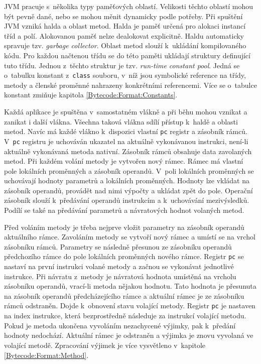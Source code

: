 JVM pracuje s~několika typy paměťových oblastí. Velikosti těchto oblastí mohou být pevně dané, nebo se mohou měnit dynamicky podle potřeby. Při spuštění JVM vzniká halda a oblast metod. Halda je paměť určená pro alokaci instancí tříd a polí. Alokovanou paměť nelze dealokovat explicitně. Haldu automaticky spravuje tzv. \textit{garbage collector}. Oblast metod slouží k~ukládání kompilovaného kódu. Pro každou načtenou třídu se do této paměti ukládají struktury definující tuto třídu. Jednou z~těchto struktur je tzv. \textit{run-time constant pool}. Jedná se o~tabulku konstant z~\texttt{class} souboru, v~níž jsou symbolické reference na třídy, metody a členské proměnné nahrazeny konkrétními referencemi. Více se o~tabulce konstant zmiňuje kapitola \ref{Bytecode:Format:Constants}.

Každá aplikace je spuštěna v~samostatném vlákně a při běhu mohou vznikat a zanikat i další vlákna. Všechna taková vlákna sdílí přístup k~haldě a oblasti metod. Navíc má každé vlákno k~dispozici vlastní \texttt{pc} registr a zásobník rámců. V~\texttt{pc} registru je uchováván ukazatel na aktuálně vykonávanou instrukci, není-li aktuálně vykonávaná metoda nativní. Zásobník rámců obsahuje data zavolaných metod. Při každém volání metody je vytvořen nový rámec. Rámec má vlastní pole lokálních proměnných a zásobník operandů. V~poli lokálních proměnných se uchovávají hodnoty parametrů a lokálních proměnných. Hodnoty lze vkládat na zásobník operandů, provádět nad nimi výpočty a ukládat zpět do pole. Operační zásobník slouží k~předávání operandů instrukcím a k~uchovávání mezivýsledků. Podílí se také na předávání parametrů a návratových hodnot volaných metod.

Před voláním metody je třeba nejprve vložit parametry na zásobník operandů aktuálního rámce. Zavoláním metody se vytvoří nový rámec a umístí se na vrchol zásobníku rámců. Parametry se následně přesunou ze zásobníku operandů předchozího rámce do pole lokálních proměnných nového rámce. Registr \texttt{pc} se nastaví na první instrukci volané metody a začnou se vykonávat jednotlivé instrukce. Při návratu z~metody je návratová hodnota umístěná na vrcholu zásobníku operandů, vrací-li metoda nějakou hodnotu. Tato hodnota je přesunuta na zásobník operandů předcházejícího rámce a aktuální rámec je ze zásobníku rámců odstraněn. Dojde k~obnovení stavu volající metody. Registr \texttt{pc} je nastaven na index instrukce, která bezprostředně následuje za instrukcí volající metodu. Pokud je metoda ukončena vyvoláním nezachycené výjimky, pak k~předání hodnoty nedochází. Aktuální rámec je odstraněn a výjimka je znovu vyvolaná ve volající metodě. Zpracování výjimek je více vysvětleno v~kapitole \ref{Bytecode:Format:Method}.

